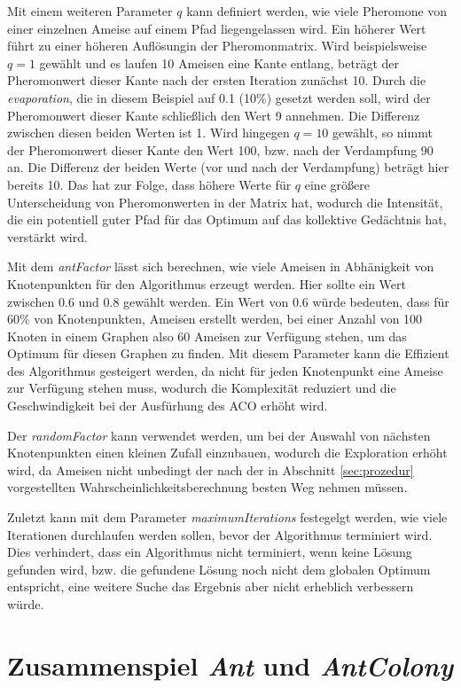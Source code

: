 Mit einem weiteren Parameter $q$ kann definiert werden, wie viele
Pheromone von einer einzelnen Ameise auf einem Pfad liegengelassen wird. Ein
höherer Wert führt zu einer höheren \glqq Auflösung\grqq in der Pheromonmatrix.
Wird beispielsweise $q=1$ gewählt und es laufen 10 Ameisen eine Kante entlang,
beträgt der Pheromonwert dieser Kante nach der ersten Iteration zunächst 10.
Durch die \emph{evaporation}, die in diesem Beispiel auf 0.1 (10\%) gesetzt
werden soll, wird der Pheromonwert dieser Kante schließlich den Wert 9
annehmen. Die Differenz zwischen diesen beiden Werten ist 1.
Wird hingegen $q=10$ gewählt, so nimmt der Pheromonwert dieser Kante den
Wert 100, bzw. nach der Verdampfung 90 an. Die Differenz der beiden Werte
(vor und nach der Verdampfung) beträgt hier bereits 10.
Das hat zur Folge, dass höhere Werte für $q$ eine größere Unterscheidung von
Pheromonwerten in der Matrix hat, wodurch die Intensität, die ein potentiell
guter Pfad für das Optimum auf das kollektive Gedächtnis hat, verstärkt wird.

Mit dem \emph{antFactor} lässt sich berechnen, wie viele Ameisen in Abhänigkeit
von Knotenpunkten für den Algorithmus erzeugt werden. Hier sollte ein Wert
zwischen 0.6 und 0.8 gewählt werden. Ein Wert von 0.6 würde bedeuten, dass für
60\% von Knotenpunkten, Ameisen erstellt werden, bei einer Anzahl von 100
Knoten in einem Graphen also 60 Ameisen zur Verfügung stehen, um das Optimum
für diesen Graphen zu finden. Mit diesem Parameter kann die Effizient des
Algorithmus gesteigert werden, da nicht für jeden Knotenpunkt eine Ameise zur
Verfügung stehen muss, wodurch die Komplexität reduziert und die
Geschwindigkeit bei der Ausfürhung des ACO erhöht wird.

Der \emph{randomFactor} kann verwendet werden, um bei der Auswahl von
nächsten Knotenpunkten einen kleinen Zufall einzubauen, wodurch die Exploration
erhöht wird, da Ameisen nicht unbedingt der nach der in Abschnitt
\ref{sec:prozedur} vorgestellten Wahrscheinlichkeitsberechnung besten Weg
nehmen müssen.

Zuletzt kann mit dem Parameter \emph{maximumIterations} festegelgt werden,
wie viele Iterationen durchlaufen werden sollen, bevor der Algorithmus
terminiert wird. Dies verhindert, dass ein Algorithmus nicht terminiert, wenn
keine Lösung gefunden wird, bzw. die gefundene Lösung noch nicht dem globalen
Optimum entspricht, eine weitere Suche das Ergebnis aber nicht erheblich
verbessern würde.

\section{Zusammenspiel \emph{Ant} und \emph{AntColony}}

